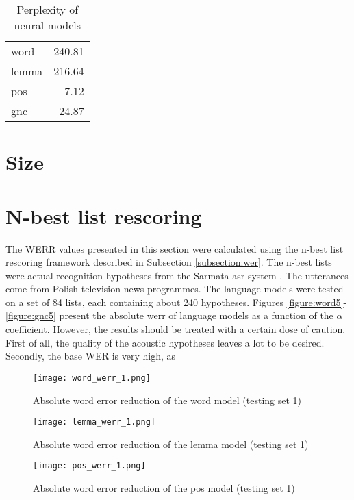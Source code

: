 \begin{table}[!htbp]
	\centering
	\caption{Perplexity of neural models}
	\label{table:wer_neural}
	\begin{tabular*}{.4\linewidth}{@{\extracolsep{\fill}}lr}
		word   & 240.81\\
		lemma  & 216.64\\
		pos    & 7.12\\
		gnc    & 24.87\\
	\end{tabular*}
\end{table}

\section{Size}
\section{N-best list rescoring}
The WERR values presented in this section were calculated using the n-best list rescoring framework described in Subsection \ref{subsection:wer}. The n-best lists were actual recognition hypotheses from the Sarmata \gls{asr} system \cite{ziolko2011automatic}. The utterances come from Polish television news programmes. The language models were tested on a set of 84 lists, each containing about 240 hypotheses. Figures \ref{figure:word5}-\ref{figure:gnc5} present the absolute \gls{werr} of language models as a function of the $\alpha$ coefficient. However, the results should be treated with a certain dose of caution. First of all, the quality of the acoustic hypotheses leaves a lot to be desired. Secondly, the base WER is very high, as 

\label{section:nbest}
\begin{figure}[!htbp]
	  \centering
	  \texttt{[image: word\_werr\_1.png]}
	      \caption{Absolute word error reduction of the word model (testing set 1)}
	      \label{figure:word1}
\end{figure}

\begin{figure}[!htbp]
	  \centering
	  \texttt{[image: lemma\_werr\_1.png]}
	      \caption{Absolute word error reduction of the lemma model (testing set 1)}
	      \label{figure:lemmy1}
\end{figure}

\begin{figure}[!htbp]
	  \centering
	  \texttt{[image: pos\_werr\_1.png]}
	      \caption{Absolute word error reduction of the pos model (testing set 1)}
	      \label{figure:pos1}
\end{figure}

